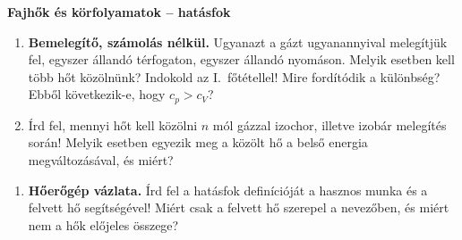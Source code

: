 \documentclass[12pt]{article}
\begin{document}
\begin{center}
  {\Large\bfseries Fajhők és körfolyamatok -- hatásfok}\\[3pt]
\end{center}

\begin{enumerate}
\item \textbf{Bemelegítő, számolás nélkül.} Ugyanazt a gázt ugyanannyival melegítjük fel,
  egyszer állandó térfogaton, egyszer állandó nyomáson. Melyik esetben kell több hőt
  közölnünk? Indokold az I.~főtétellel! Mire fordítódik a különbség? Ebből következik-e,
  hogy $c_p > c_V$?

\item Írd fel, mennyi hőt kell közölni $n$ mól gázzal izochor, illetve izobár melegítés
  során! Melyik esetben egyezik meg a közölt hő a belső energia megváltozásával, és miért?
\end{enumerate}
\begin{minipage}[t]{0.70\linewidth}\vspace{0pt}
\begin{enumerate}[start=3]
\item \textbf{Hőerőgép vázlata.} Írd fel a hatásfok definícióját a hasznos munka és a
  felvett hő segítségével! Miért csak a felvett hő szerepel a nevezőben, és miért nem a
  hők előjeles összege?
\end{enumerate}
\end{minipage}\hfill
\begin{minipage}[t]{0.27\linewidth}\vspace{0pt}\centering
\end{minipage}
\end{document}
